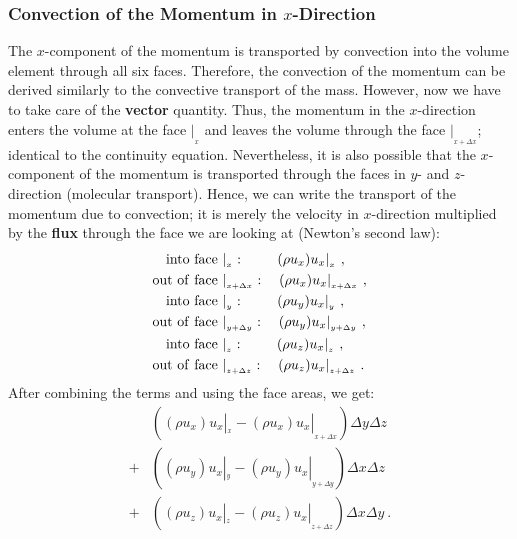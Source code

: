 \documentclass[MathematicsNumericsDerivationsAndOpenFOAM.tex]{subfiles}
\begin{document}
\subsubsection{Convection of the Momentum in $x$-Direction}
%
%
%
    The $x$-component of the momentum is transported by convection into the
    volume element through all six faces. Therefore, the convection of the
    momentum can be derived similarly to the convective transport of the mass.
    However, now we have to take care of the \textbf{vector} quantity.
    Thus, the momentum in the $x$-direction enters the volume at the
    face $|_{_x}$ and leaves the volume through the face $|_{_{x+\Delta x}}$;
    identical to the continuity equation. Nevertheless, it is also possible
    that the $x$-component of the momentum is transported through the faces in
    $y$- and $z$-direction (molecular transport). Hence, we can write the
    transport of the momentum due to convection; it is merely the velocity
    in $x$-direction multiplied by the \textbf{flux} through the face we are
    looking at (Newton's second law):
%
%
\begin{align*}
 \mathrm{into~face~}&|_{_x}: ~~~~~~~
 (\rho u_x)u_x|_{_x} ~, \\
 \mathrm{out~of~face~}&|_{_{x+\Delta x}}: ~~~
 (\rho u_x)u_x |_{_{x+\Delta x}} ~,
 \\
 \mathrm{into~face~}&|_{_y} : ~~~~~~~
 (\rho u_y)u_x |_{_y} ~, \\
 \mathrm{out~of~face~}&|_{_{y+\Delta y}} : ~~~
 (\rho u_y)u_x |_{_{y+\Delta y}} ~,
 \\
 \mathrm{into~face~}&|_{_z} : ~~~~~~~
 (\rho u_z)u_x |_{_z} ~, \\
 \mathrm{out~of~face~}&|_{_{z+\Delta z}} : ~~~
 (\rho u_z)u_x |_{_{z+\Delta z}} ~.
\end{align*}
%
%
	After combining the terms and using the face areas, we get:
%
%
\begin{align*}
  &\left(
    (\rho u_x)u_x |_{_x} - (\rho u_x)u_x |_{_{x+\Delta x}}
  \right)
  \Delta y \Delta z \\
  +&\left(
    (\rho u_y)u_x |_{_y} - (\rho u_y)u_x |_{_{y+\Delta y}}
  \right)
  \Delta x \Delta z  \\
  +&\left(
    (\rho u_z)u_x |_{_z} - (\rho u_z)u_x |_{_{z+\Delta z}}
  \right)
  \Delta x \Delta y ~.
\end{align*}
%
%
%
%
\end{document}

